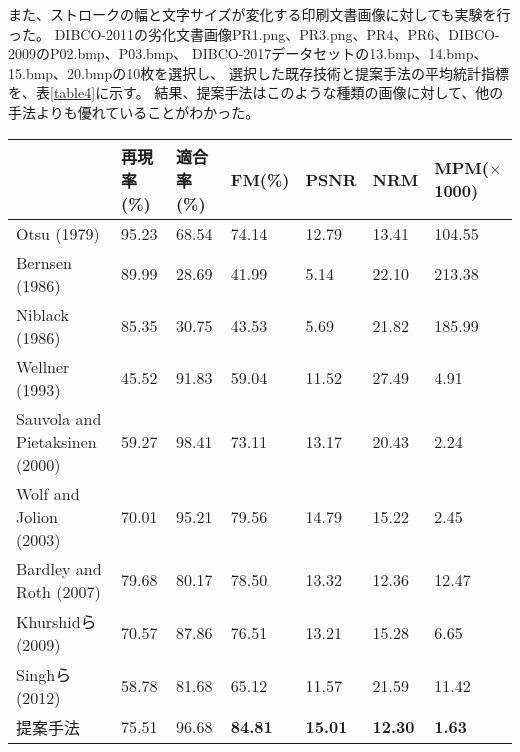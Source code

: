 \documentclass[uplatex, twocolumn,10pt]{jsarticle}
\begin{document}
また、ストロークの幅と文字サイズが変化する印刷文書画像に対しても実験を行った。
DIBCO-2011の劣化文書画像PR1.png、PR3.png、PR4、PR6、DIBCO-2009のP02.bmp、P03.bmp、
DIBCO-2017データセットの13.bmp、14.bmp、15.bmp、20.bmpの10枚を選択し、
選択した既存技術と提案手法の平均統計指標を、表\ref{table4}に示す。
結果、提案手法はこのような種類の画像に対して、他の手法よりも優れていることがわかった。


\begin{table*}[tp]
    \centering
    \caption{ストローク幅が異なり密集したテキストがある画像に対する様々な手法の定量的比較}
    \label{table4}
    \begin{tabular}{lllllll}
        \hline
                                       & 再現率(\%) & 適合率(\%) & FM(\%)         & PSNR           & NRM            & MPM($\times$1000) \\
        \hline
        Otsu (1979)                    & 95.23      & 68.54      & 74.14          & 12.79          & 13.41          & 104.55            \\
        Bernsen (1986)                 & 89.99      & 28.69      & 41.99          & 5.14           & 22.10          & 213.38            \\ 
        Niblack (1986)                 & 85.35      & 30.75      & 43.53          & 5.69           & 21.82          & 185.99            \\
        Wellner (1993)                 & 45.52      & 91.83      & 59.04          & 11.52          & 27.49          & 4.91              \\
        Sauvola and Pietaksinen (2000) & 59.27      & 98.41      & 73.11          & 13.17          & 20.43          & 2.24              \\
        Wolf and Jolion (2003)         & 70.01      & 95.21      & 79.56          & 14.79          & 15.22          & 2.45              \\
        Bardley and Roth (2007)        & 79.68      & 80.17      & 78.50          & 13.32          & 12.36          & 12.47             \\
        Khurshidら (2009)              & 70.57      & 87.86      & 76.51          & 13.21          & 15.28          & 6.65              \\
        Singhら (2012)                 & 58.78      & 81.68      & 65.12          & 11.57          & 21.59          & 11.42             \\
        提案手法                       & 75.51      & 96.68      & \textbf{84.81} & \textbf{15.01} & \textbf{12.30} & \textbf{1.63}     \\
        \hline
    \end{tabular}
\end{table*}
\end{document}
